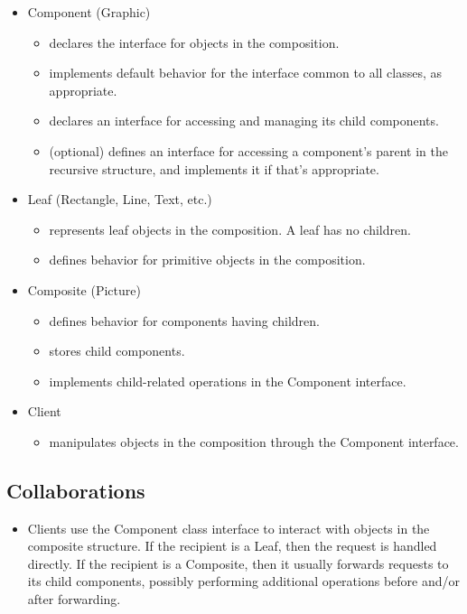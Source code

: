 \begin{itemize}
    \item Component (Graphic)
    \begin{itemize}
        \item declares the interface for objects in the composition.
        \item implements default behavior for the interface common to all classes, as appropriate.
        \item declares an interface for accessing and managing its child components.
        \item (optional) defines an interface for accessing a component's parent in the recursive structure, and implements it if that's appropriate.
    \end{itemize}
    \item Leaf (Rectangle, Line, Text, etc.)
    \begin{itemize}
        \item represents leaf objects in the composition. A leaf has no children.
        \item defines behavior for primitive objects in the composition.
    \end{itemize}
    \item Composite (Picture)
    \begin{itemize}
        \item defines behavior for components having children.
        \item stores child components.
        \item implements child-related operations in the Component interface.
    \end{itemize}
    \item Client
    \begin{itemize}
        \item manipulates objects in the composition through the Component interface.
    \end{itemize}
\end{itemize}

\subsection*{Collaborations}

\begin{itemize}
    \item Clients use the Component class interface to interact with objects in the composite structure. If the recipient is a Leaf, then the request is handled directly. If the recipient is a Composite, then it usually forwards requests to its child components, possibly performing additional operations before and/or after forwarding.
\end{itemize}

